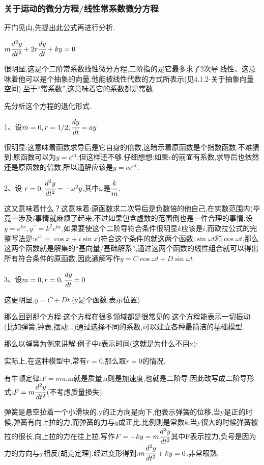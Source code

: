 \documentclass[UTF8,12pt]{ctexbook}
\newcommand{\doubleDerivative}{^{\prime\prime}}
\begin{document}
{{{{}%

\subsubsection{关于运动的微分方程/线性常系数微分方程}{
开门见山,先提出此公式再进行分析.

$m\cfrac{d^2y}{dt^2} + 2r\cfrac{dy}{dt} + ky = 0$

很明显,这是个二阶常系数线性微分方程,二阶指的是它最多求了2次导.线性、这意味着他可以是个抽象的向量,他能被线性代数的方式所表示(见4.1.2-关于抽象向量空间).至于“常系数”,这意味着它的系数都是常数.

先分析这个方程的退化形式.

1、设$m = 0, r = 1/2, \cfrac{dy}{dt} = ay$

很明显:这意味着函数求导后是它自身的倍数,这暗示着原函数是个指数函数.不难猜到:原函数可以为$y = e^{at}$.但这样还不够.仔细想想:如果e的前面有系数,求导后也依然还是原函数的倍数,所以通解应该是$y = ce^{at}$.

2、设 $r = 0, \cfrac{d^2y}{dt^2} = -\omega^2y$,其中$\omega$是$\cfrac{k}{m}$.

这又意味着什么？这意味着:原函数求二次导后是负数倍的他自己,在实数范围内(毕竟一涉及$i$事情就麻烦了起来,不过如果包含虚数的范围倒也是一件合理的事情,设$y=e^{kx},y\doubleDerivative = k^{2}e^{kx}$,如果要使这个二阶导符合条件很明显$k$应该是$i$,而欧拉公式的完整写法是:$e^{ix} = \cos x + i\sin x$)符合这个条件的就这两个函数:$\sin\omega t$和$\cos\omega t$,那么这两个函数就是解集的“基向量/基础解系”,通过这两个函数的线性组合就可以得出所有符合条件的原函数,因此通解写作$y = C\cos\omega t + D\sin\omega t$

3、设$m = 0, r = 0, \cfrac{dy}{dt} = 0$

这更明显,$y = C + Dt$.(y是个函数,表示位置)

那么回到那个方程:这个方程在很多领域都是很常见的.这个方程能表示一切振动.(比如弹簧,钟表,摆动...)通过选择不同的系数,可以建立各种最简洁的基础模型.

那么以弹簧为例来讲解.例子中$t$表示时间(这就是为什么不用x):

实际上,在这种模型中,常有$r = 0$.那么取$ r = 0$的情况.

有牛顿定律:$F = ma$,m就是质量,a则是加速度,也就是二阶导,因此改写成二阶导形式:$F = m\cfrac{d^2y}{dt^2}$(不考虑质量损失)

弹簧是悬空拉着一个小滑块的.y的正方向是向下,他表示弹簧的位移,当y是正的时候,弹簧有向上拉的力,而弹簧的力与$y$成正比,比例则是常数$k$.当y很大的时候弹簧被拉的很长,向上拉的力在往上拉,写作$F = -ky = m\cfrac{d^2y}{dt^2}$其中F表示拉力,负号是因为力的方向与y相反(胡克定理).经过变形得到:$m\cfrac{d^2y}{dt^2} + ky = 0$.非常眼熟.

}}}}
\end{document}
